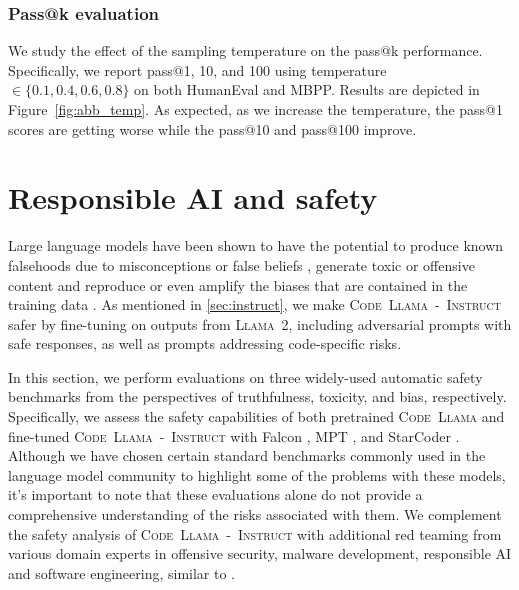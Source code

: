 \subsubsection{Pass@k evaluation} We study the effect of the sampling temperature on the pass@k performance. Specifically, we report pass@1, 10, and 100 using temperature $\in \{0.1, 0.4, 0.6, 0.8\}$ on both HumanEval and MBPP. Results are depicted in Figure~\ref{fig:abb_temp}. As expected, as we increase the temperature, the pass@1 scores are getting worse while the pass@10 and pass@100 improve. 

\section{Responsible AI and safety}\label{sec:safety}

Large language models have been shown to have the potential to produce known falsehoods due to misconceptions or false beliefs \citep{lin2021truthfulqa}, generate toxic or offensive content \citep{hartvigsen2022toxigen} and reproduce or even amplify the biases that are contained in the training data \citep{dhamala2021bold}. As mentioned in \ref{sec:instruct}, we make \textsc{Code~Llama~-~Instruct} safer by fine-tuning on outputs from \textsc{Llama~2}, including adversarial prompts with safe responses, as well as prompts addressing code-specific risks.

In this section, we perform evaluations on three widely-used automatic safety benchmarks from the perspectives of truthfulness, toxicity, and bias, respectively. Specifically, we assess the safety capabilities of both pretrained \textsc{Code~Llama} and fine-tuned \textsc{Code~Llama~-~Instruct} with Falcon \citep{falcon40b}, MPT \citep{themosaicmlnlpteam2023introducing}, and StarCoder \citep{li2023starcoder}. Although we have chosen certain standard benchmarks commonly used in the language model community to highlight some of the problems with these models, it's important to note that these evaluations alone do not provide a comprehensive understanding of the risks associated with them. We complement the safety analysis of \textsc{Code~Llama~-~Instruct} with additional red teaming from various domain experts in offensive security, malware development, responsible AI and software engineering, similar to \cite{touvron2023llamav2}.

